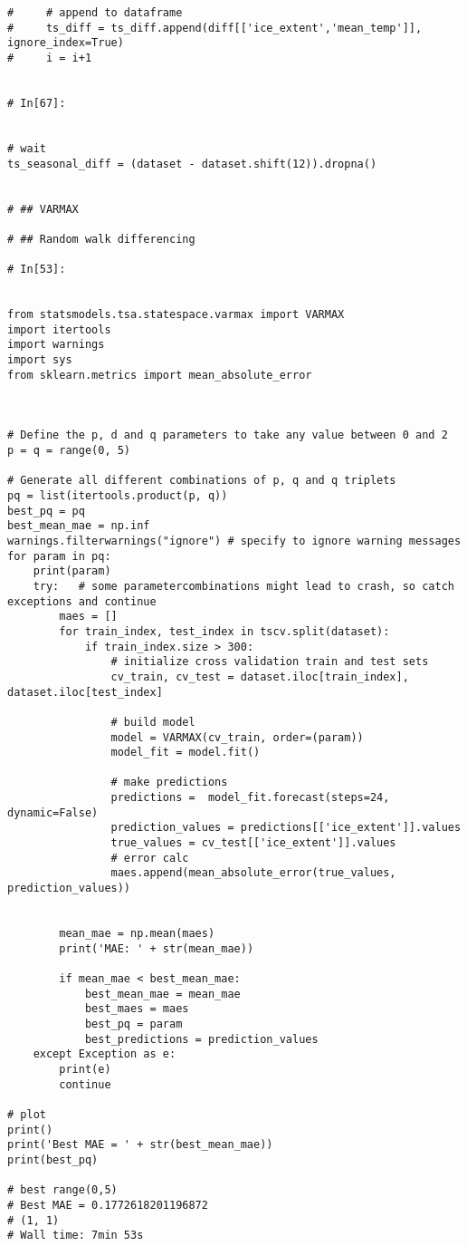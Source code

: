 \begin{verbatim}
#     # append to dataframe
#     ts_diff = ts_diff.append(diff[['ice_extent','mean_temp']], ignore_index=True)
#     i = i+1


# In[67]:


# wait 
ts_seasonal_diff = (dataset - dataset.shift(12)).dropna()


# ## VARMAX

# ## Random walk differencing

# In[53]:


from statsmodels.tsa.statespace.varmax import VARMAX
import itertools
import warnings
import sys
from sklearn.metrics import mean_absolute_error



# Define the p, d and q parameters to take any value between 0 and 2
p = q = range(0, 5)

# Generate all different combinations of p, q and q triplets
pq = list(itertools.product(p, q))
best_pq = pq
best_mean_mae = np.inf
warnings.filterwarnings("ignore") # specify to ignore warning messages
for param in pq:
    print(param)
    try:   # some parametercombinations might lead to crash, so catch exceptions and continue
        maes = []
        for train_index, test_index in tscv.split(dataset):
            if train_index.size > 300:
                # initialize cross validation train and test sets
                cv_train, cv_test = dataset.iloc[train_index], dataset.iloc[test_index]

                # build model
                model = VARMAX(cv_train, order=(param))
                model_fit = model.fit()

                # make predictions
                predictions =  model_fit.forecast(steps=24, dynamic=False)
                prediction_values = predictions[['ice_extent']].values
                true_values = cv_test[['ice_extent']].values
                # error calc
                maes.append(mean_absolute_error(true_values, prediction_values))

        
        mean_mae = np.mean(maes)
        print('MAE: ' + str(mean_mae))    

        if mean_mae < best_mean_mae:
            best_mean_mae = mean_mae
            best_maes = maes
            best_pq = param
            best_predictions = prediction_values
    except Exception as e:
        print(e)
        continue
   
# plot
print()
print('Best MAE = ' + str(best_mean_mae))
print(best_pq)

# best range(0,5)
# Best MAE = 0.1772618201196872
# (1, 1)
# Wall time: 7min 53s



\end{verbatim}

